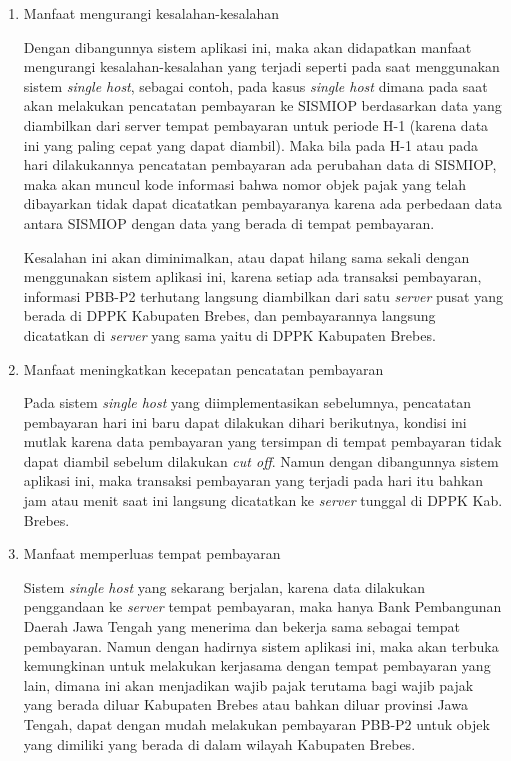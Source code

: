 \documentclass[pdftex, 12pt, oneside]{article}
\begin{document}
\begin{enumerate}[1.]
  \item Manfaat mengurangi kesalahan-kesalahan
  
  Dengan dibangunnya sistem aplikasi ini, maka akan didapatkan manfaat mengurangi kesalahan-kesalahan yang terjadi seperti pada saat menggunakan sistem \textit{single host}, sebagai contoh, pada kasus \textit{single host} dimana pada saat akan melakukan pencatatan pembayaran ke SISMIOP berdasarkan data yang diambilkan dari server tempat pembayaran untuk periode H-1 (karena data ini yang paling cepat yang dapat diambil). Maka bila pada H-1 atau pada hari dilakukannya pencatatan pembayaran ada perubahan data di SISMIOP, maka akan muncul kode informasi bahwa nomor objek pajak yang telah dibayarkan tidak dapat dicatatkan pembayaranya karena ada perbedaan data antara SISMIOP dengan data yang berada di tempat pembayaran. 
  
  Kesalahan ini akan diminimalkan, atau dapat hilang sama sekali dengan menggunakan sistem aplikasi ini, karena setiap ada transaksi pembayaran, informasi PBB-P2 terhutang langsung diambilkan dari satu \textit{server} pusat yang berada di DPPK Kabupaten Brebes, dan pembayarannya langsung dicatatkan di \textit{server} yang sama yaitu di DPPK Kabupaten Brebes.
  
  \item Manfaat meningkatkan kecepatan pencatatan pembayaran
  
  Pada sistem \textit{single host} yang diimplementasikan sebelumnya, pencatatan pembayaran hari ini baru dapat dilakukan dihari berikutnya, kondisi ini mutlak karena data pembayaran yang tersimpan di tempat pembayaran tidak dapat diambil sebelum dilakukan \textit{cut off}. Namun dengan dibangunnya sistem aplikasi ini, maka transaksi pembayaran yang terjadi pada hari itu bahkan jam atau menit saat ini langsung dicatatkan ke \textit{server} tunggal di DPPK Kab. Brebes.
  
  \item Manfaat memperluas tempat pembayaran
  
  Sistem \textit{single host} yang sekarang berjalan, karena data dilakukan penggandaan ke \textit{server} tempat pembayaran, maka hanya Bank Pembangunan Daerah Jawa Tengah yang menerima dan bekerja sama sebagai tempat pembayaran. Namun dengan hadirnya sistem aplikasi ini, maka akan terbuka kemungkinan untuk melakukan kerjasama dengan tempat pembayaran yang lain, dimana ini akan menjadikan wajib pajak terutama bagi wajib pajak yang berada diluar Kabupaten Brebes atau bahkan diluar provinsi Jawa Tengah, dapat dengan mudah melakukan pembayaran PBB-P2 untuk objek yang dimiliki yang berada di dalam wilayah Kabupaten Brebes.
  

\end{enumerate}
\end{document}
